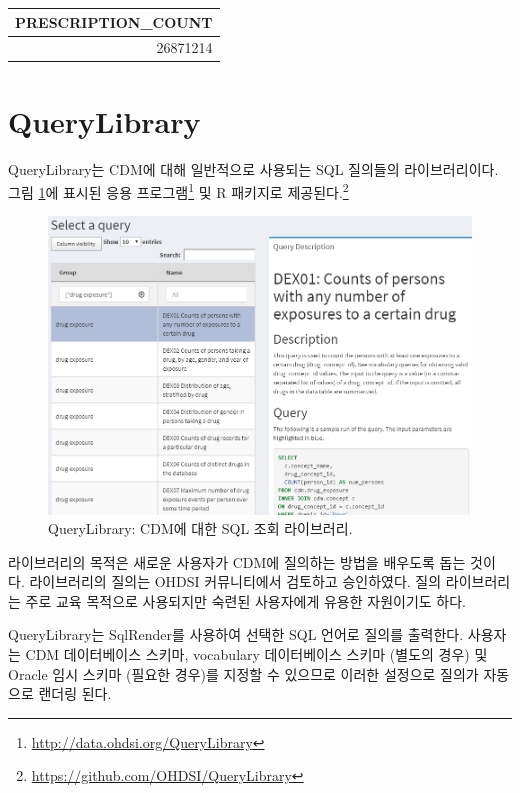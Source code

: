 \documentclass[11pt]{book}
\let\rmarkdownfootnote\footnote%
\def\footnote{\protect\rmarkdownfootnote}
\theoremstyle{definition}
\theoremstyle{definition}
\theoremstyle{definition}
\theoremstyle{remark}
\begin{document}
\begin{longtable}[]{@{}r@{}}
\toprule
PRESCRIPTION\_COUNT\tabularnewline
\midrule
\endhead
26871214\tabularnewline
\bottomrule
\end{longtable}

\section{QueryLibrary}\label{querylibrary}


QueryLibrary는 CDM에 대해 일반적으로 사용되는 SQL 질의들의
라이브러리이다. 그림 \ref{fig:queryLibrary}에 표시된 응용
프로그램\footnote{\url{http://data.ohdsi.org/QueryLibrary}} 및 R
패키지로 제공된다.\footnote{\url{https://github.com/OHDSI/QueryLibrary}}

\begin{figure}

{\centering \includegraphics[width=1\linewidth]{images/SqlAndR/queryLibrary} 

}

\caption{QueryLibrary: CDM에 대한 SQL 조회 라이브러리.}\label{fig:queryLibrary}
\end{figure}

라이브러리의 목적은 새로운 사용자가 CDM에 질의하는 방법을 배우도록 돕는
것이다. 라이브러리의 질의는 OHDSI 커뮤니티에서 검토하고 승인하였다. 질의
라이브러리는 주로 교육 목적으로 사용되지만 숙련된 사용자에게 유용한
자원이기도 하다.

QueryLibrary는 SqlRender를 사용하여 선택한 SQL 언어로 질의를 출력한다.
사용자는 CDM 데이터베이스 스키마, vocabulary 데이터베이스 스키마 (별도의
경우) 및 Oracle 임시 스키마 (필요한 경우)를 지정할 수 있으므로 이러한
설정으로 질의가 자동으로 랜더링 된다.
\end{document}
